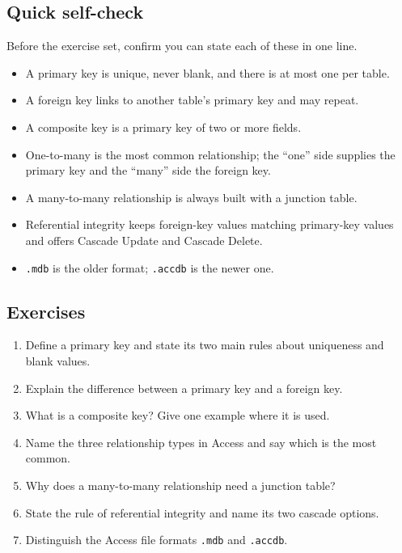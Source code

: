 \documentclass[11pt]{article}
\begin{document}
\subsection*{Quick self-check}
Before the exercise set, confirm you can state each of these in one line.
\begin{itemize}
  \item A primary key is unique, never blank, and there is at most one per
    table.
  \item A foreign key links to another table's primary key and may repeat.
  \item A composite key is a primary key of two or more fields.
  \item One-to-many is the most common relationship; the ``one'' side supplies
    the primary key and the ``many'' side the foreign key.
  \item A many-to-many relationship is always built with a junction table.
  \item Referential integrity keeps foreign-key values matching primary-key
    values and offers Cascade Update and Cascade Delete.
  \item \texttt{.mdb} is the older format; \texttt{.accdb} is the newer one.
\end{itemize}

\subsection*{Exercises}
\begin{enumerate}[label=\arabic*.]
  \item Define a primary key and state its two main rules about uniqueness and
    blank values.
  \item Explain the difference between a primary key and a foreign key.
  \item What is a composite key? Give one example where it is used.
  \item Name the three relationship types in Access and say which is the most
    common.
  \item Why does a many-to-many relationship need a junction table?
  \item State the rule of referential integrity and name its two cascade
    options.
  \item Distinguish the Access file formats \texttt{.mdb} and \texttt{.accdb}.
\end{enumerate}
\end{document}
